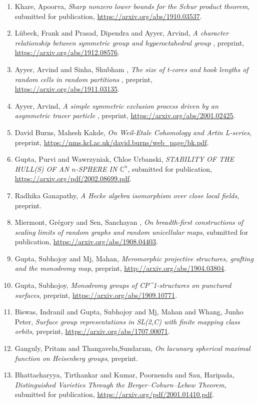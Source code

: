 \begin{enumerate}
\item Khare, Apoorva, \emph{Sharp nonzero lower bounds for the Schur product theorem}, submitted for publication, \url{https://arxiv.org/abs/1910.03537}.
\item Lübeck, Frank and Prasad, Dipendra and Ayyer, Arvind, \emph{A character relationship between symmetric group and hyperoctahedral group }, preprint, \url{https://arxiv.org/abs/1912.08576}.
\item Ayyer, Arvind and Sinha, Shubham , \emph{The size of t-cores and hook lengths of random cells in random partitions }, preprint, \url{https://arxiv.org/abs/1911.03135}.
\item Ayyer, Arvind, \emph{ A simple symmetric exclusion process driven by an asymmetric tracer particle }, preprint, \url{https://arxiv.org/abs/2001.02425}.
\item David Burns, Mahesh Kakde, \emph{On Weil-Etale Cohomology and Artin L-series}, preprint, \url{https://nms.kcl.ac.uk/david.burns/web_page/bk.pdf}.
\item Gupta, Purvi and Wawrzyniak, Chloe Urbanski, \emph{STABILITY OF THE HULL(S) OF AN $n$-SPHERE IN $\mathbb{C}^n$}, submitted for publication, \url{https://arxiv.org/pdf/2002.08699.pdf}.
\item Radhika Ganapathy, \emph{A Hecke algebra isomorphism over close local fields}, preprint.
\item Miermont, Grégory and Sen, Sanchayan , \emph{On breadth-first constructions of scaling limits of random graphs and random unicellular maps}, submitted for publication, \url{https://arxiv.org/abs/1908.04403}.
\item Gupta, Subhojoy and Mj, Mahan, \emph{Meromorphic projective structures, grafting and the monodromy map}, preprint, \url{http://arxiv.org/abs/1904.03804}.
\item Gupta, Subhojoy, \emph{Monodromy groups of CP^1-structures on punctured surfaces}, preprint, \url{https://arxiv.org/abs/1909.10771}.
\item Biswas, Indranil and Gupta, Subhojoy and Mj, Mahan and Whang, Junho Peter, \emph{Surface group representations in SL(2,C) with finite mapping class orbits}, preprint, \url{https://arxiv.org/abs/1707.00071}.
\item Ganguly, Pritam and Thangavelu,Sundaram, \emph{On lacunary spherical maximal function on Heisenberg groups}, preprint.
\item Bhattacharyya, Tirthankar and Kumar, Poornendu and Sau, Haripada, \emph{Distinguished Varieties Through the Berger--Coburn--Lebow Theorem}, submitted for publication, \url{https://arxiv.org/pdf/2001.01410.pdf}.

\end{enumerate}
